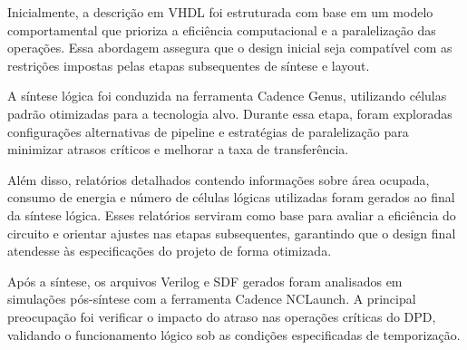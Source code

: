 Inicialmente, a descrição em VHDL foi estruturada com base em um modelo comportamental que prioriza a eficiência computacional e a paralelização das operações. Essa abordagem assegura que o design inicial seja compatível com as restrições impostas pelas etapas subsequentes de síntese e layout.  

A síntese lógica foi conduzida na ferramenta Cadence Genus, utilizando células padrão otimizadas para a tecnologia alvo. Durante essa etapa, foram exploradas configurações alternativas de pipeline e estratégias de paralelização para minimizar atrasos críticos e melhorar a taxa de transferência.  

Além disso, relatórios detalhados contendo informações sobre área ocupada, consumo de energia e número de células lógicas utilizadas foram gerados ao final da síntese lógica. Esses relatórios serviram como base para avaliar a eficiência do circuito e orientar ajustes nas etapas subsequentes, garantindo que o design final atendesse às especificações do projeto de forma otimizada.

Após a síntese, os arquivos Verilog e SDF gerados foram analisados em simulações pós-síntese com a ferramenta Cadence NCLaunch. A principal preocupação foi verificar o impacto do atraso nas operações críticas do DPD, validando o funcionamento lógico sob as condições especificadas de temporização.  




